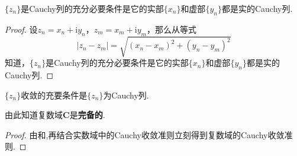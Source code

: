 \documentclass[../../main.tex]{subfiles}
\begin{document}
\begin{theorem}\label{theorem:复数Cauchy列充要条件}
\(\{ z_n \}\)是Cauchy列的充分必要条件是它的实部\(\{ x_n \}\)和虚部\(\{ y_n \}\)都是实的Cauchy列.
\end{theorem}
\begin{proof}
设\(z_n = x_n + \mathrm{i}y_n\)，\(z_m = x_m + \mathrm{i}y_m\)，那么从等式
\[
| z_n - z_m | = \sqrt{(x_n - x_m)^2 + (y_n - y_m)^2}
\]
知道，\(\{ z_n \}\)是Cauchy列的充分必要条件是它的实部\(\{ x_n \}\)和虚部\(\{ y_n \}\)都是实的Cauchy列.

\end{proof}

\begin{theorem}[复数域的Cauchy收敛准则]\label{theorem:复数域的Cauchy收敛准则}
\(\{ z_n \}\)收敛的充要条件是\(\{ z_n \}\)为Cauchy列.
\end{theorem}
\begin{note}
由此知道复数域\(\mathbf{C}\)是\textbf{完备的}.
\end{note}
\begin{proof}
由和,再结合实数域中的Cauchy收敛准则立刻得到复数域的Cauchy收敛准则.

\end{proof}
\end{document}
